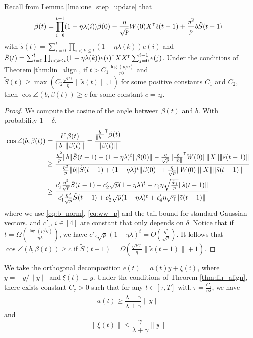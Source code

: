 \begin{lemma}
\label{lma:suf_cond}
Recall from Lemma \ref{lma:one_step_update} that
\begin{equation*}
\beta(t)=\prod_{i=0}^{t-1}(1-\eta\lambda(i))\beta(0) -\frac{\eta}{\sqrt p}W(0)X\transpose \tilde{s}(t-1) +\frac{\eta^2}{p}b \tilde{S}(t-1)
\end{equation*}
with $\tilde{s}(t) = \sum_{i=0}^{t}\prod_{i<k\leq t}(1-\eta\lambda(k)) e(i)$ and $\tilde{S}(t) = \sum_{i=0}^{t}\prod_{i<k\leq t}(1-\eta\lambda(k))e(i)\transpose XX\transpose \sum_{j=0}^{i-1}e(j)$. Under the conditions of Theorem \ref{thm:lin_align}, if $t>C_1\frac{\log (p/\eta)}{\eta\lambda}$ and $\tilde{S}(t)\geq \max(C_2\frac{\sqrt{p\gamma}}{\eta}\|\tilde{s}(t)\|,1)$ for some positive constants $C_1$ and $C_2$, then $\cos\angle(b, \beta(t)) \geq c$ for some constant $c=c_\delta$.
\end{lemma}
\begin{proof}
We compute the cosine of the angle between $\beta(t)$ and $b$. With probability $1-\delta$,
\begin{equation*}
\begin{aligned}
    \cos\angle(b, \beta(t)) 
    &= \frac{b\transpose \beta(t)}{\|b\|\|\beta(t)\|}= \frac{\frac{b}{\|b\|}\transpose \beta(t)}{\|\beta(t)\|}\\
    &\geq \frac{\frac{\eta^2}{p}\|b\|\tilde{S}(t-1) - (1-\eta\lambda)^t\|\beta(0)\| - \frac{\eta}{\sqrt p}\|\frac{b}{\|b\|}\transpose W(0)\|\|X\|\|\tilde{s}(t-1)\|}{\frac{\eta^2}{p}\|b\|\tilde{S}(t-1)+(1-\eta\lambda)^t\|\beta(0)\| + \frac{\eta}{\sqrt p}\|W(0)\|\|X\|\|\tilde{s}(t-1)\|} \\
    &\geq \frac{c'_1\frac{\eta^2}{\sqrt p}\tilde{S}(t-1) - c'_2\sqrt p(1-\eta\lambda)^t- c'_3\eta\sqrt{\frac{d\gamma}{p}}\|\tilde{s}(t-1)\|}{c'_1\frac{\eta^2}{\sqrt p}\tilde{S}(t-1) + c'_2\sqrt p(1-\eta\lambda)^t+ c'_4\eta\sqrt{\gamma}\|\tilde{s}(t-1)\|}
\end{aligned}
\end{equation*}
where we use \eqref{eq:b_norm}, \eqref{eq:ww_p} and the tail bound for standard Gaussian vectors, and $c'_i$, $i\in[4]$ are constant that only depends on $\delta$. Notice that if $t=\Omega(\frac{\log (p/\eta)}{\eta\lambda})$, we have $c'_2\sqrt p(1-\eta\lambda)^t = O(\frac{\eta^2}{\sqrt p})$. It follows that $\cos\angle(b, \beta(t)) \geq c$ if $\tilde{S}(t-1)=\Omega(\frac{\sqrt{p\gamma}}{\eta}\|\tilde{s}(t-1)\|+1)$.
\end{proof}

\begin{lemma}
\label{lma:decomp_1}
We take the orthogonal decomposition $e(t) = a(t)\bar{y}+\xi(t)$, where $\bar{y}=-y/\|y\|$ and $\xi(t)\perp y$. Under the conditions of Theorem \ref{thm:lin_align}, there exists constant $C_\tau>0$ such that for any $t\in[\tau,T]$ with $\tau=\frac{C_\tau}{\eta\lambda}$, we have
\begin{equation}
\label{eq:at_lbd}
a(t)\geq \frac{\lambda - \gamma}{\lambda+\gamma}\|y\|  
\end{equation}
and 
\begin{equation}
\label{eq:xit_ubd}
\|\xi(t)\|\leq \frac{\gamma}{\lambda+\gamma}\|y\|
\end{equation}
\end{lemma}

